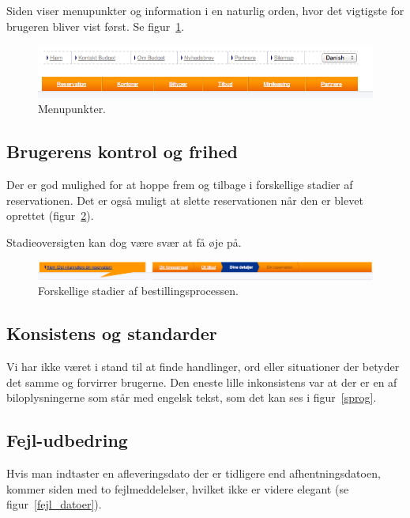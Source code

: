 \documentclass[a4paper]{article}
\begin{document}
Siden viser menupunkter og information i en naturlig orden, hvor det vigtigste
for brugeren bliver vist først. Se figur~\ref{menu}.

\begin{figure}[htbp]
  \begin{center}
    \includegraphics[width=\textwidth]{2.png}
  \end{center}
  \caption{Menupunkter.}
  \label{menu}
\end{figure}

\subsection{Brugerens kontrol og frihed}
Der er god mulighed for at hoppe frem og tilbage i forskellige stadier af
reservationen. Det er også muligt at slette reservationen når den er blevet
oprettet (figur~\ref{stadier}).

Stadieoversigten kan dog være svær at få øje på.
\begin{figure}[htbp]
  \begin{center}
    \includegraphics[width=\textwidth]{9.png}
  \end{center}
  \caption{Forskellige stadier af bestillingsprocessen.}
  \label{stadier}
\end{figure}

\subsection{Konsistens og standarder}
Vi har ikke været i stand til at finde handlinger, ord eller situationer der
betyder det samme og forvirrer brugerne. Den eneste lille inkonsistens
var at der er en af biloplysningerne som står med engelsk tekst, som
det kan ses i figur~\ref{sprog}.

\subsection{Fejl-udbedring}
Hvis man indtaster en afleveringsdato der er tidligere end
afhentningsdatoen, kommer siden med to fejlmeddelelser, hvilket ikke
er videre elegant (se figur~\ref{fejl_datoer}).
\end{document}
